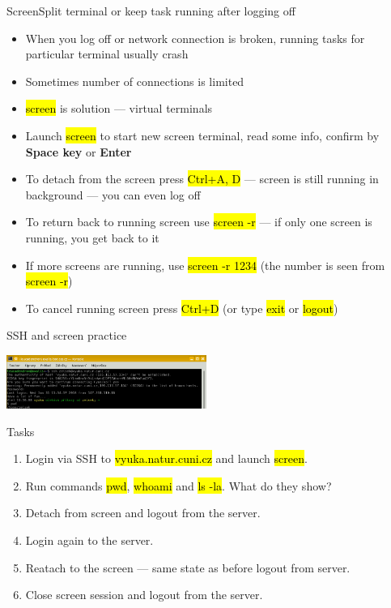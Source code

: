 \documentclass[compress, ucs, xelatex, 11pt, xcolor=svgnames,
  hyperref={
    bookmarks=true,
    unicode=true,
    colorlinks=true,
    pdftitle={Linux, command line and MetaCentrum},
    plainpages=false,
    pdfauthor={Vojtech Zeisek},
    pdfsubject={Course about use of Linux command line, writing shell scripts and using MetaCentrum of CESNET},
    pdfcreator={XeLaTeX},
    pdfkeywords={Linux, GNU, BASH, shell, command line, MetaCentrum},
    linkcolor=DarkRed,
    anchorcolor=DarkBlue,
    citecolor=Indigo,
    filecolor=NavyBlue,
    menucolor=DarkMagenta,
    urlcolor=DarkBlue,
    pdftex},
  url={hyphens, lowtilde} %
  ]{beamer}
\renewcommand{\texttt}[1]{\hl{\ttfamily #1}}
\begin{document}
\begin{frame}{Screen}{Split terminal or keep task running after logging off}
  \begin{itemize}
    \item When you log off or network connection is broken, running tasks for particular terminal usually crash
    \item Sometimes number of connections is limited
    \item \texttt{screen} is solution --- virtual terminals
    \item Launch \texttt{screen} to start new screen terminal, read some info, confirm by \textbf{Space key} or \textbf{Enter}
    \item To detach from the screen press \texttt{Ctrl+A, D} --- screen is still running in background --- you can even log off
    \item To return back to running screen use \texttt{screen -r} --- if only one screen is running, you get back to it
    \item If more screens are running, use \texttt{screen -r 1234} (the number is seen from \texttt{screen -r})
    \item To cancel running screen press \texttt{Ctrl+D} (or type \texttt{exit} or \texttt{logout})
  \end{itemize}
\end{frame}

\begin{frame}{SSH and screen practice}
  \begin{center}
    \includegraphics[height=1.75cm]{sshterm.png}
  \end{center}
  \begin{block}{Tasks}
    \begin{enumerate}
      \item Login via SSH to \texttt{vyuka.natur.cuni.cz} and launch \texttt{screen}.
      \item Run commands \texttt{pwd}, \texttt{whoami} and \texttt{ls -la}. What do they show?
      \item Detach from screen and logout from the server.
      \item Login again to the server.
      \item Reatach to the screen --- same state as before logout from server.
      \item Close screen session and logout from the server.
    \end{enumerate}
  \end{block}
\end{frame}
\end{document}
